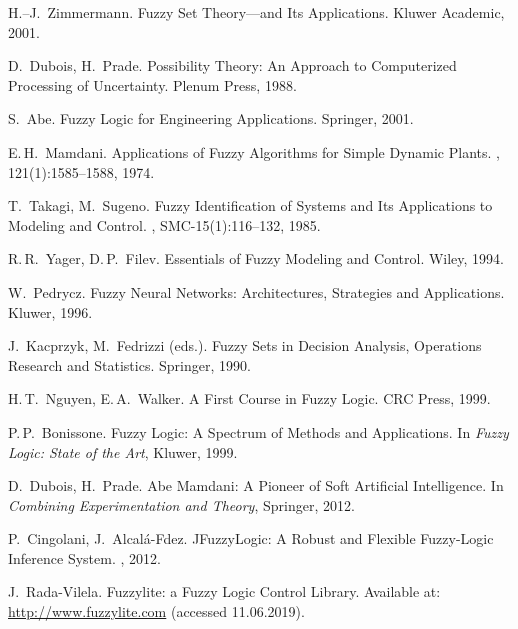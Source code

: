 \begin{thebibliography}{200}
H.--J.~Zimmermann.
\newblock Fuzzy Set Theory—and Its Applications.
\newblock Kluwer Academic, 2001.

D.~Dubois, H.~Prade.
\newblock Possibility Theory: An Approach to Computerized Processing of Uncertainty.
\newblock Plenum Press, 1988.

S.~Abe.
\newblock Fuzzy Logic for Engineering Applications.
\newblock Springer, 2001.

E.\,H.~Mamdani.
\newblock Applications of Fuzzy Algorithms for Simple Dynamic Plants.
, 121(1):1585–1588, 1974.

T.~Takagi, M.~Sugeno.
\newblock Fuzzy Identification of Systems and Its Applications to Modeling and Control.
, SMC-15(1):116–132, 1985.

R.\,R.~Yager, D.\,P.~Filev.
\newblock Essentials of Fuzzy Modeling and Control.
\newblock Wiley, 1994.

W.~Pedrycz.
\newblock Fuzzy Neural Networks: Architectures, Strategies and Applications.
\newblock Kluwer, 1996.

J.~Kacprzyk, M.~Fedrizzi (eds.).
\newblock Fuzzy Sets in Decision Analysis, Operations Research and Statistics.
\newblock Springer, 1990.

H.\,T.~Nguyen, E.\,A.~Walker.
\newblock A First Course in Fuzzy Logic.
\newblock CRC Press, 1999.

P.\,P.~Bonissone.
\newblock Fuzzy Logic: A Spectrum of Methods and Applications.
\newblock In {\em Fuzzy Logic: State of the Art}, Kluwer, 1999.

D.~Dubois, H.~Prade.
\newblock Abe Mamdani: A Pioneer of Soft Artificial Intelligence.
\newblock In {\em Combining Experimentation and Theory}, Springer, 2012.

P.~Cingolani, J.~Alcalá-Fdez.
\newblock JFuzzyLogic: A Robust and Flexible Fuzzy-Logic Inference System.
, 2012.

J.~Rada-Vilela.
\newblock Fuzzylite: a Fuzzy Logic Control Library.
\newblock Available at: \url{http://www.fuzzylite.com} (accessed 11.06.2019).


\end{thebibliography}
